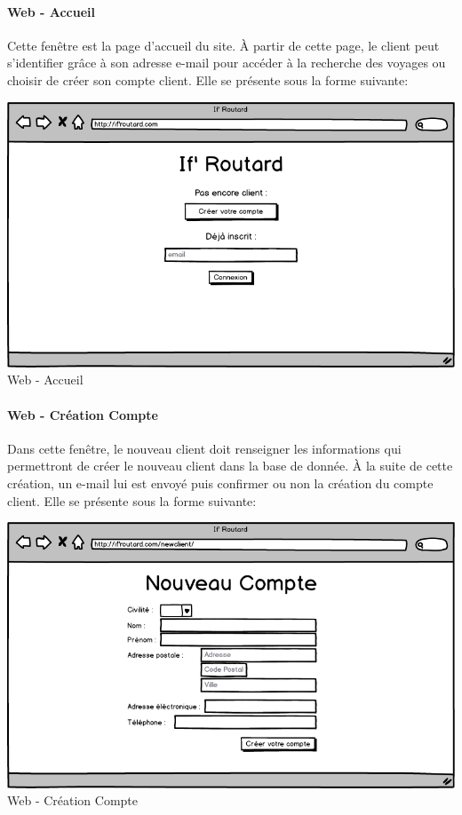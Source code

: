 \documentclass[11pt]{article}
\begin{document}
\paragraph{Web - Accueil}
Cette fenêtre est la page d'accueil du site. À partir de cette page, le client peut s'identifier grâce à son adresse e-mail pour accéder à la recherche des voyages ou choisir de créer son compte client. Elle se présente sous la forme suivante: 
\begin{center}
\includegraphics[scale = 0.4]{../Conception_graphique/png_Pour_CR/Web-00-Accueil.png}
\newline
Web - Accueil
\label{fig:Web-Accueil}
\end{center}

\paragraph{Web - Création Compte}
Dans cette fenêtre, le nouveau client doit renseigner les informations qui permettront de créer le nouveau client dans la base de donnée. À la suite de cette création, un e-mail lui est envoyé puis confirmer ou non la création du compte client. Elle se présente sous la forme suivante:
\begin{center}
\includegraphics[scale = 0.4]{../Conception_graphique/png_Pour_CR/Web-10-Creation_Compte.png}
\newline
Web - Création Compte
\label{fig:Creation-Compte}
\end{center}
\end{document}
